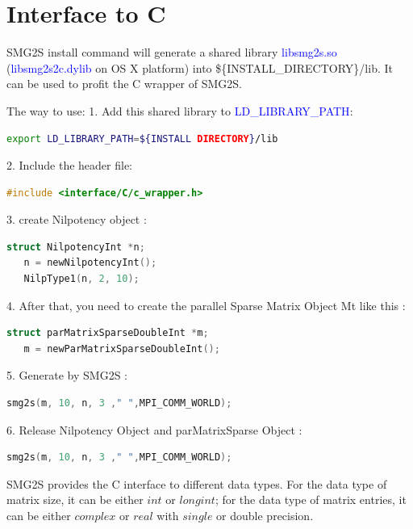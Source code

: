 \documentclass[a4paper, 10 pt]{report}
\begin{document}
	\section{Interface to C}
	SMG2S install command will generate a shared library \textcolor{blue}{libsmg2s.so} (\textcolor{blue}{libsmg2s2c.dylib} on OS X platform) into \$\{INSTALL\_DIRECTORY\}/lib. It can be used to profit the C wrapper of SMG2S. 
	
	The way to use:
	1. Add this shared library to \textcolor{blue}{LD\_LIBRARY\_PATH}:
	
	\begin{lstlisting}[language=bash,frame=single]
   export LD_LIBRARY_PATH=${INSTALL DIRECTORY}/lib
	\end{lstlisting}

	2. Include the header file:
	\begin{lstlisting}[language=C,frame=single]
  #include <interface/C/c_wrapper.h>
	\end{lstlisting}
	
	3. create Nilpotency object :
	
	\begin{lstlisting}[language=C,frame=single]
   struct NilpotencyInt *n;
   n = newNilpotencyInt();
   NilpType1(n, 2, 10);
	\end{lstlisting}
	
	4. After that, you need to create the parallel Sparse Matrix Object Mt like this :

	\begin{lstlisting}[language=C,frame=single]
   struct parMatrixSparseDoubleInt *m;
   m = newParMatrixSparseDoubleInt();
	\end{lstlisting}

	5. Generate by SMG2S :
	
	\begin{lstlisting}[language=C,frame=single]
   smg2s(m, 10, n, 3 ," ",MPI_COMM_WORLD);
    \end{lstlisting}

   6. Release Nilpotency Object and parMatrixSparse Object :
	\begin{lstlisting}[language=C,frame=single]
   smg2s(m, 10, n, 3 ," ",MPI_COMM_WORLD);
   \end{lstlisting}

	SMG2S provides the C interface to different data types. For the data type of matrix size, it can be either $int$ or $long int$; for the data type of matrix entries, it can be either $complex$ or $real$ with $single$ or double precision.
	
\end{document}
